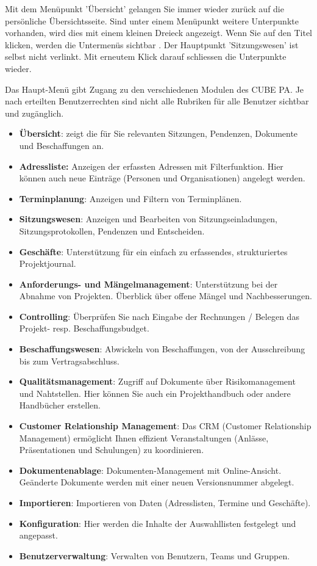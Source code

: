 \vspace{\baselineskip}

Mit dem Menüpunkt 'Übersicht'  gelangen Sie immer wieder zurück auf die persönliche Übersichtsseite. Sind unter einem Menüpunkt weitere Unterpunkte vorhanden, wird dies mit einem kleinen Dreieck angezeigt. Wenn Sie auf den Titel klicken, werden die Untermenüs sichtbar . Der Hauptpunkt 'Sitzungswesen' ist selbst nicht verlinkt. Mit erneutem Klick darauf schliessen die Unterpunkte wieder.

\vspace{\baselineskip}

Das Haupt-Menü gibt Zugang zu den verschiedenen Modulen des CUBE PA. Je nach erteilten Benutzerrechten sind nicht alle Rubriken für alle Benutzer sichtbar und zugänglich.

\begin{itemize}
\item
\textbf{Übersicht}: zeigt die für Sie relevanten Sitzungen, Pendenzen, Dokumente und Beschaffungen an.
\item
\textbf{Adressliste: }Anzeigen der erfassten Adressen mit Filterfunktion. Hier können auch neue Einträge (Personen und Organisationen) angelegt werden.
\item
\textbf{Terminplanung}: Anzeigen und Filtern von Terminplänen.
\item
\textbf{Sitzungswesen}: Anzeigen und Bearbeiten von Sitzungseinladungen, Sitzungsprotokollen, Pendenzen und
Entscheiden.
\item
\textbf{Geschäfte}: Unterstützung für ein einfach zu erfassendes, strukturiertes Projektjournal.
\item
\textbf{Anforderungs- und Mängelmanagement}: Unterstützung bei der Abnahme von Projekten. Überblick über offene Mängel und Nachbesserungen.
\item
\textbf{Controlling}: Überprüfen Sie nach Eingabe der Rechnungen / Belegen das Projekt- resp. Beschaffungsbudget.
\item
\textbf{Beschaffungswesen}: Abwickeln von Beschaffungen, von der Ausschreibung bis zum Vertragsabschluss.
\item
\textbf{Qualitätsmanagement}: Zugriff auf Dokumente über Risikomanagement und Nahtstellen. Hier können Sie auch ein Projekthandbuch oder andere Handbücher erstellen.
\item
\textbf{Customer Relationship Management}: Das CRM (Customer Relationship Management) ermöglicht Ihnen effizient Veranstaltungen (Anlässe, Präsentationen und Schulungen) zu koordinieren.
\item
\textbf{Dokumentenablage}: Dokumenten-Management mit Online-Ansicht. Geänderte Dokumente werden mit einer neuen Versionsnummer abgelegt.
\item
\textbf{Importieren}: Importieren von Daten (Adresslisten, Termine und Geschäfte).
\item
\textbf{Konfiguration}: Hier werden die Inhalte der Auswahllisten festgelegt und angepasst.
\item
\textbf{Benutzerverwaltung}: Verwalten von Benutzern, Teams und Gruppen.
\end{itemize}

